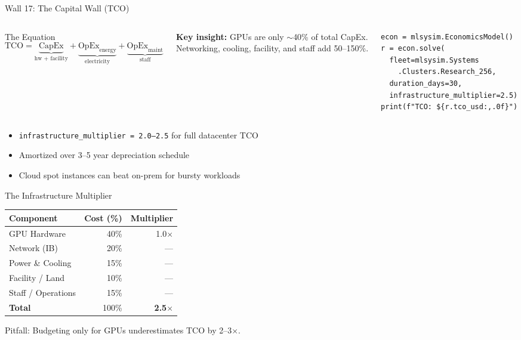 \documentclass[aspectratio=169, 12pt]{beamer}
\begin{document}
\begin{frame}[fragile]{Wall 17: The Capital Wall (TCO)}
\begin{columns}[T]
\begin{block}{The Equation}
\[
\text{TCO} = \underbrace{\text{CapEx}}_{\text{hw + facility}}
          + \underbrace{\text{OpEx}_{\text{energy}}}_{\text{electricity}}
          + \underbrace{\text{OpEx}_{\text{maint}}}_{\text{staff}}
\]
\end{block}
\vspace{0.3em}
\small
\textbf{Key insight:} GPUs are only $\sim$40\% of total CapEx.\\
Networking, cooling, facility, and staff add 50--150\%.

\begin{lstlisting}
econ = mlsysim.EconomicsModel()
r = econ.solve(
  fleet=mlsysim.Systems
    .Clusters.Research_256,
  duration_days=30,
  infrastructure_multiplier=2.5)
print(f"TCO: ${r.tco_usd:,.0f}")
\end{lstlisting}
\end{columns}

\vspace{0.3em}
\small
\begin{itemize}\setlength\itemsep{1pt}
  \item \texttt{infrastructure\_multiplier = 2.0--2.5} for full datacenter TCO
  \item Amortized over 3--5 year depreciation schedule
  \item Cloud spot instances can beat on-prem for bursty workloads
\end{itemize}
\end{frame}

\begin{frame}{The Infrastructure Multiplier}
\centering
\begin{tabular}{lrr}
\toprule
\textbf{Component} & \textbf{Cost (\%)} & \textbf{Multiplier} \\
\midrule
GPU Hardware       & 40\% & 1.0$\times$ \\
Network (IB)       & 20\% & --- \\
Power \& Cooling   & 15\% & --- \\
Facility / Land    & 10\% & --- \\
Staff / Operations & 15\% & --- \\
\midrule
\textbf{Total}     & 100\% & \textbf{2.5$\times$} \\
\bottomrule
\end{tabular}

\vspace{1em}
\alert{Pitfall:} Budgeting only for GPUs underestimates TCO by 2--3$\times$.
\end{frame}
\end{document}
